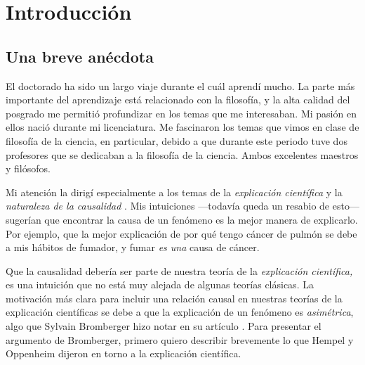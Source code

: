 
\chapter*{Introducción}
\label{ch:introduction}

\section{Una breve anécdota}

\noindent El doctorado ha sido un largo viaje durante el cuál
aprendí mucho. La parte más importante del aprendizaje está
relacionado con la filosofía, y la alta calidad del posgrado me permitió profundizar en los
temas que me interesaban. Mi pasión en ellos nació durante mi
licenciatura. Me fascinaron los temas que vimos en clase de
filosofía de la ciencia, en particular, debido a que durante este
periodo tuve dos profesores que se dedicaban a la filosofía de la
ciencia. Ambos excelentes maestros y filósofos.

Mi atención la dirigí especialmente a los temas de la \emph
{explicación científica} y la \emph{naturaleza de la causalidad
}. Mis intuiciones ---todavía queda un resabio de esto--- sugerían
que encontrar la causa de un fenómeno es la mejor manera de
explicarlo. Por ejemplo, que la mejor explicación de por qué tengo
cáncer de pulmón se debe a mis hábitos de fumador, y fumar \emph{es
	una} causa de cáncer.

Que la causalidad debería ser parte de nuestra teoría de la
\emph{explicación científica,} es una intuición que no está muy
alejada de algunas teorías clásicas. La motivación más clara para
incluir una relación causal en nuestras teorías de la explicación
científicas se debe a que la explicación de un fenómeno es \emph
{asimétrica}, algo que Sylvain Bromberger hizo notar en su artículo
. Para presentar el argumento de
Bromberger, primero quiero describir brevemente lo que Hempel y
Oppenheim dijeron en torno a la explicación científica.

